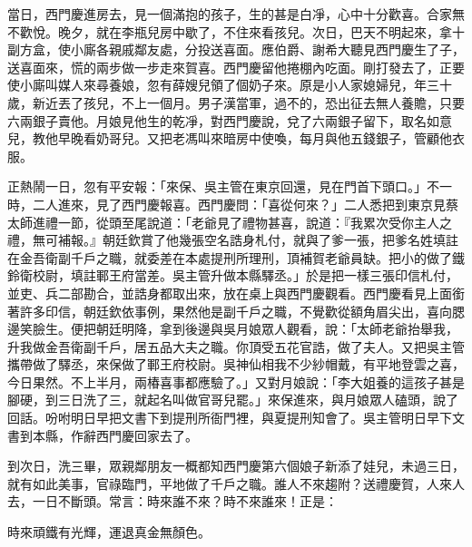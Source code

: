 當日，西門慶進房去，見一個滿抱的孩子，生的甚是白凈，心中十分歡喜。合家無不歡悅。晚夕，就在李瓶兒房中歇了，不住來看孩兒。次日，巴天不明起來，拿十副方盒，使小廝各親戚鄰友處，分投送喜面。應伯爵、謝希大聽見西門慶生了子，送喜面來，慌的兩步做一步走來賀喜。西門慶留他捲棚內吃面。剛打發去了，正要使小廝叫媒人來尋養娘，忽有薛嫂兒領了個奶子來。原是小人家媳婦兒，年三十歲，新近丟了孩兒，不上一個月。男子漢當軍，過不的，恐出征去無人養贍，只要六兩銀子賣他。月娘見他生的乾凈，對西門慶說，兌了六兩銀子留下，取名如意兒，教他早晚看奶哥兒。又把老馮叫來暗房中使喚，每月與他五錢銀子，管顧他衣服。

正熱鬧一日，忽有平安報：「來保、吳主管在東京回還，見在門首下頭口。」不一時，二人進來，見了西門慶報喜。西門慶問：「喜從何來？」二人悉把到東京見蔡太師進禮一節，從頭至尾說道：「老爺見了禮物甚喜，說道：『我累次受你主人之禮，無可補報。』朝廷欽賞了他幾張空名誥身札付，就與了爹一張，把爹名姓填註在金吾衛副千戶之職，就委差在本處提刑所理刑，頂補賀老爺員缺。把小的做了鐵鈴衛校尉，填註鄆王府當差。吳主管升做本縣驛丞。」於是把一樣三張印信札付，並吏、兵二部勘合，並誥身都取出來，放在桌上與西門慶觀看。西門慶看見上面銜著許多印信，朝廷欽依事例，果然他是副千戶之職，不覺歡從額角眉尖出，喜向腮邊笑臉生。便把朝廷明降，拿到後邊與吳月娘眾人觀看，說：「太師老爺抬舉我，升我做金吾衛副千戶，居五品大夫之職。你頂受五花官誥，做了夫人。又把吳主管攜帶做了驛丞，來保做了鄆王府校尉。吳神仙相我不少紗帽戴，有平地登雲之喜，今日果然。不上半月，兩椿喜事都應驗了。」又對月娘說：「李大姐養的這孩子甚是腳硬，到三日洗了三，就起名叫做官哥兒罷。」來保進來，與月娘眾人磕頭，說了回話。吩咐明日早把文書下到提刑所衙門裡，與夏提刑知會了。吳主管明日早下文書到本縣，作辭西門慶回家去了。

到次日，洗三畢，眾親鄰朋友一概都知西門慶第六個娘子新添了娃兒，未過三日，就有如此美事，官祿臨門，平地做了千戶之職。誰人不來趨附？送禮慶賀，人來人去，一日不斷頭。常言：時來誰不來？時不來誰來！正是：

時來頑鐵有光輝，運退真金無顏色。

